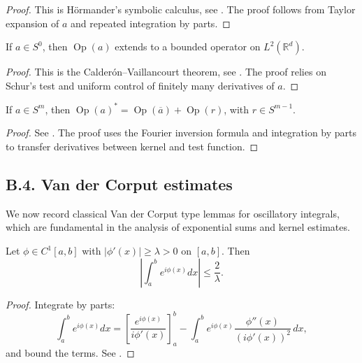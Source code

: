 \begin{proof}
This is Hörmander’s symbolic calculus, see \cite[Chapter~18]{HormanderIII}. The proof follows from Taylor expansion of $a$ and repeated integration by parts.
\end{proof}

\begin{lemma}[$L^2$-boundedness]
\label{lem:pdo-L2}
If $a \in S^0$, then $\operatorname{Op}(a)$ extends to a bounded operator on $L^2(\mathbb{R}^d)$.
\end{lemma}

\begin{proof}
This is the Calderón–Vaillancourt theorem, see \cite[Theorem~2.3]{Zworski}. The proof relies on Schur’s test and uniform control of finitely many derivatives of $a$.
\end{proof}

\begin{lemma}[Adjoint]
\label{lem:pdo-adjoint}
If $a \in S^m$, then $\operatorname{Op}(a)^* = \operatorname{Op}(\overline{a}) + \operatorname{Op}(r)$, with $r \in S^{m-1}$.
\end{lemma}

\begin{proof}
See \cite[Section~18.6]{HormanderIII}. The proof uses the Fourier inversion formula and integration by parts to transfer derivatives between kernel and test function.
\end{proof}

\medskip

\subsection*{B.4. Van der Corput estimates}
\label{appB:vdc}

We now record classical Van der Corput type lemmas for oscillatory integrals, which are fundamental in the analysis of exponential sums and kernel estimates.

\begin{lemma}
\label{lem:vdc1}
Let $\phi \in C^1[a,b]$ with $|\phi'(x)| \geq \lambda > 0$ on $[a,b]$. Then
\[
\left|\int_a^b e^{i \phi(x)} dx\right| \leq \frac{2}{\lambda}.
\]
\end{lemma}

\begin{proof}
Integrate by parts:
\[
\int_a^b e^{i \phi(x)} dx = \left[ \frac{e^{i \phi(x)}}{i \phi'(x)} \right]_a^b - \int_a^b e^{i \phi(x)} \frac{\phi''(x)}{(i\phi'(x))^2}\, dx,
\]
and bound the terms. See \cite[Chapter~VIII]{Stein1993}.
\end{proof}

